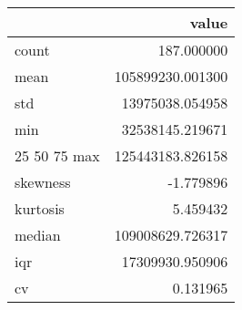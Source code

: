 \begin{tabular}{lr}
\toprule
 & value \\
\midrule
count & 187.000000 \\
mean & 105899230.001300 \\
std & 13975038.054958 \\
min & 32538145.219671 \\
25%
50%
75%
max & 125443183.826158 \\
skewness & -1.779896 \\
kurtosis & 5.459432 \\
median & 109008629.726317 \\
iqr & 17309930.950906 \\
cv & 0.131965 \\
\bottomrule
\end{tabular}
